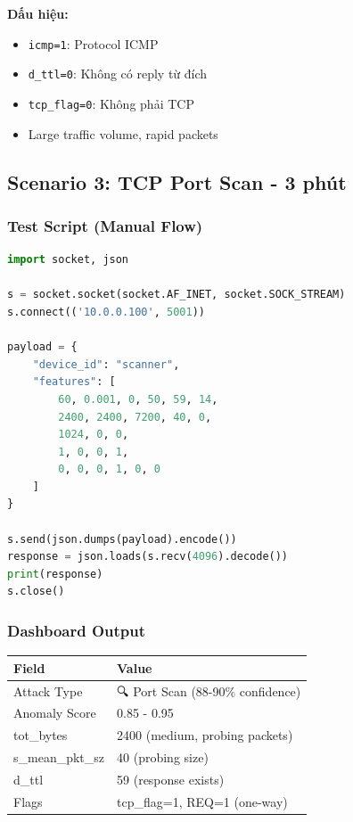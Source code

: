 \documentclass[12pt,a4paper]{article}
\begin{document}
\textbf{Dấu hiệu:}
\begin{itemize}
    \item \texttt{icmp=1}: Protocol ICMP
    \item \texttt{d\_ttl=0}: Không có reply từ đích
    \item \texttt{tcp\_flag=0}: Không phải TCP
    \item Large traffic volume, rapid packets
\end{itemize}

\subsection{Scenario 3: TCP Port Scan - 3 phút}

\subsubsection{Test Script (Manual Flow)}
\begin{lstlisting}[language=python]
import socket, json

s = socket.socket(socket.AF_INET, socket.SOCK_STREAM)
s.connect(('10.0.0.100', 5001))

payload = {
    "device_id": "scanner",
    "features": [
        60, 0.001, 0, 50, 59, 14,
        2400, 2400, 7200, 40, 0,
        1024, 0, 0,
        1, 0, 0, 1,
        0, 0, 0, 1, 0, 0
    ]
}

s.send(json.dumps(payload).encode())
response = json.loads(s.recv(4096).decode())
print(response)
s.close()
\end{lstlisting}

\subsubsection{Dashboard Output}
\begin{table}[h]
\centering
\begin{tabularx}{\textwidth}{|l|X|}
\hline
\textbf{Field} & \textbf{Value} \\
\hline
Attack Type & 🔍 \color{red}Port Scan (88-90\% confidence) \\
\hline
Anomaly Score & 0.85 - 0.95 \\
\hline
tot\_bytes & 2400 (medium, probing packets) \\
\hline
s\_mean\_pkt\_sz & 40 (probing size) \\
\hline
d\_ttl & 59 (response exists) \\
\hline
Flags & tcp\_flag=1, REQ=1 (one-way) \\
\hline
\end{tabularx}
\end{table}
\end{document}
